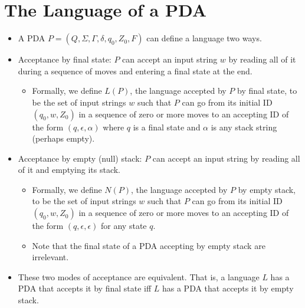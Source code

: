 \documentclass[]{article}
\begin{document}
\section{The Language of a PDA}
  \begin{itemize}
    \item A PDA $P = (Q, \Sigma, \Gamma, \delta, q_0, Z_0, F)$ can define a 
    language two ways.
    \item Acceptance by final state: $P$ can accept an input string $w$ by 
    reading all of it during a sequence of moves and entering a final state at 
    the end.
      \begin{itemize}
        \item Formally, we define $L(P)$, the language accepted by $P$ by final 
        state, to be the set of input strings $w$ such that $P$ can go from its 
        initial ID $(q_0,w,Z_0)$ in a sequence of zero or more moves to an 
        accepting ID of the form $(q,\epsilon,\alpha)$ where $q$ is a final 
        state and $\alpha$ is any stack string (perhaps empty).
      \end{itemize}
    \item Acceptance by empty (null) stack: $P$ can accept an input string by
    reading all of it and emptying its stack.
      \begin{itemize}
        \item Formally, we define $N(P)$, the language accepted by $P$ by empty
        stack, to be the set of input strings $w$ such that $P$ can go from its
        initial ID $(q_0,w,Z_0)$ in a sequence of zero or more moves to an
        accepting ID of the form $(q,\epsilon,\epsilon)$ for any state $q$.
        \item Note that the final state of a PDA accepting by empty stack are 
        irrelevant.
      \end{itemize}
    \item These two modes of acceptance are equivalent. That is, a language $L$ 
    has a PDA that accepts it by final state iff $L$ has a PDA that accepts it 
    by empty stack.
  \end{itemize}
\end{document}
